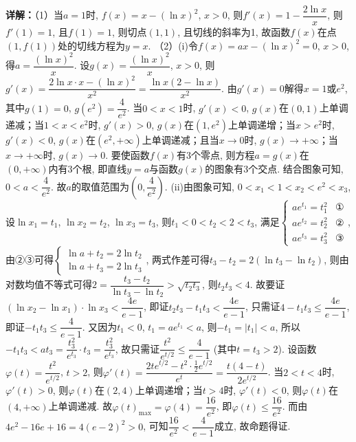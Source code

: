 \begin{question}[points=15]
\begin{solution}
\textbf{详解：}（1）当$a=1$时, $f(x) = x - (\ln x)^2$, $x > 0$, 则$f'(x) = 1 - \dfrac{2\ln x}{x}$, 则$f'(1) = 1$, 且$f(1) = 1$, 则切点$(1,1)$, 且切线的斜率为1, 故函数$f(x)$在点$(1, f(1))$处的切线方程为$y = x$.
（2）(i)令$f(x) = ax - (\ln x)^2 = 0$, $x > 0$, 得$a = \dfrac{(\ln x)^2}{x}$. 设$g(x) = \dfrac{(\ln x)^2}{x}$, $x > 0$, 则$g'(x) = \dfrac{2\ln x \cdot x - (\ln x)^2}{x^2} = \dfrac{\ln x (2 - \ln x)}{x^2}$. 由$g'(x) = 0$解得$x=1$或$e^2$, 其中$g(1)=0$, $g(e^2) = \dfrac{4}{e^2}$. 当$0 < x < 1$时, $g'(x) < 0$, $g(x)$在$(0,1)$上单调递减；当$1 < x < e^2$时, $g'(x) > 0$, $g(x)$在$(1, e^2)$上单调递增；当$x > e^2$时, $g'(x) < 0$, $g(x)$在$(e^2, +\infty)$上单调递减；且当$x \to 0$时, $g(x) \to +\infty$；当$x \to +\infty$时, $g(x) \to 0$. 要使函数$f(x)$有3个零点, 则方程$a = g(x)$在$(0, +\infty)$内有3个根, 即直线$y = a$与函数$g(x)$的图象有3个交点. 结合图象可知, $0 < a < \dfrac{4}{e^2}$. 故$a$的取值范围为$(0, \dfrac{4}{e^2})$.
(ii)由图象可知, $0 < x_1 < 1 < x_2 < e^2 < x_3$, 设$\ln x_1 = t_1$, $\ln x_2 = t_2$, $\ln x_3 = t_3$, 则$t_1 < 0 < t_2 < 2 < t_3$, 满足$\begin{cases} ae^{t_1} = t_1^2 & \text{①} \\ ae^{t_2} = t_2^2 & \text{②} \\ ae^{t_3} = t_3^2 & \text{③} \end{cases}$, 由②③可得$\begin{cases} \ln a + t_2 = 2\ln t_2 \\ \ln a + t_3 = 2\ln t_3 \end{cases}$, 两式作差可得$t_3 - t_2 = 2(\ln t_3 - \ln t_2)$, 则由对数均值不等式可得$2 = \dfrac{t_3 - t_2}{\ln t_3 - \ln t_2} > \sqrt{t_2 t_3}$, 则$t_2 t_3 < 4$. 故要证$(\ln x_2 - \ln x_1) \cdot \ln x_3 < \dfrac{4e}{e-1}$, 即证$t_2 t_3 - t_1 t_3 < \dfrac{4e}{e-1}$, 只需证$4 - t_1 t_3 \le \dfrac{4e}{e-1}$, 即证$-t_1 t_3 \le \dfrac{4}{e-1}$. 又因为$t_1 < 0$, $t_1 = ae^{t_1} < a$, 则$-t_1 = |t_1| < a$, 所以$-t_1 t_3 < a t_3 = \dfrac{t_3^2}{e^{t_3}} \cdot t_3 = \dfrac{t_3^2}{e^{t_3}}$, 故只需证$\dfrac{t^2}{e^{t/2}} \le \dfrac{4}{e-1}$ (其中$t = t_3 > 2$). 设函数$\varphi(t) = \dfrac{t^2}{e^{t/2}}$, $t > 2$, 则$\varphi'(t) = \dfrac{2t e^{t/2} - t^2 \cdot \frac{1}{2} e^{t/2}}{e^t} = \dfrac{t(4 - t)}{2e^{t/2}}$. 当$2 < t < 4$时, $\varphi'(t) > 0$, 则$\varphi(t)$在$(2,4)$上单调递增；当$t > 4$时, $\varphi'(t) < 0$, 则$\varphi(t)$在$(4, +\infty)$上单调递减. 故$\varphi(t)_{\max} = \varphi(4) = \dfrac{16}{e^2}$, 即$\varphi(t) \le \dfrac{16}{e^2}$. 而由$4e^2 - 16e + 16 = 4(e-2)^2 > 0$, 可知$\dfrac{16}{e^2} < \dfrac{4}{e-1}$成立, 故命题得证.
\end{solution}
\end{question}


